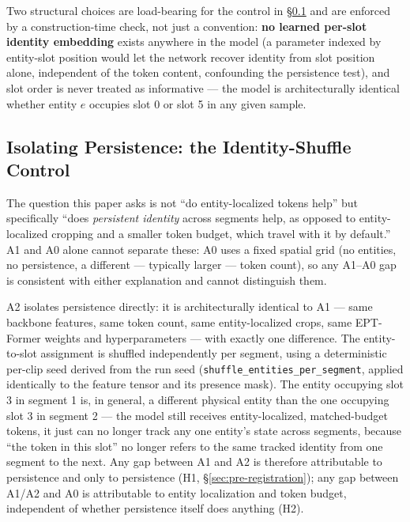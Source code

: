 Two structural choices are load-bearing for the control in
\S\ref{sec:shuffle-control} and are enforced by a construction-time check,
not just a convention: \textbf{no learned per-slot identity embedding}
exists anywhere in the model (a parameter indexed by entity-slot position
would let the network recover identity from slot position alone, independent
of the token content, confounding the persistence test), and slot order is
never treated as informative --- the model is architecturally identical
whether entity $e$ occupies slot 0 or slot 5 in any given sample.

\subsection{Isolating Persistence: the Identity-Shuffle Control}
\label{sec:shuffle-control}
The question this paper asks is not ``do entity-localized tokens help'' but
specifically ``does \emph{persistent identity} across segments help, as
opposed to entity-localized cropping and a smaller token budget, which
travel with it by default.'' A1 and A0 alone cannot separate these: A0 uses
a fixed spatial grid (no entities, no persistence, a different --- typically
larger --- token count), so any A1--A0 gap is consistent with either
explanation and cannot distinguish them.

A2 isolates persistence directly: it is architecturally identical to A1 ---
same backbone features, same token count, same entity-localized crops, same
EPT-Former weights and hyperparameters --- with exactly one difference. The
entity-to-slot assignment is shuffled independently per segment, using a
deterministic per-clip seed derived from the run seed
(\texttt{shuffle\_entities\_per\_segment}, applied identically to the
feature tensor and its presence mask). The entity occupying slot 3 in
segment 1 is, in general, a different physical entity than the one occupying
slot 3 in segment 2 --- the model still receives entity-localized,
matched-budget tokens, it just can no longer track any one entity's state
across segments, because ``the token in this slot'' no longer refers to the
same tracked identity from one segment to the next. Any gap between A1 and
A2 is therefore attributable to persistence and only to persistence
(H1, \S\ref{sec:pre-registration}); any gap between A1/A2 and A0 is
attributable to entity localization and token budget, independent of
whether persistence itself does anything (H2).
